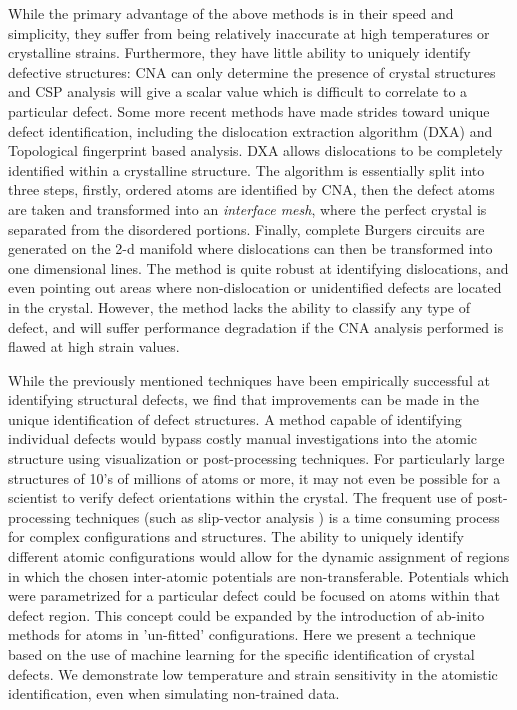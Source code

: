 \documentclass[12pt]{iopart}
\begin{document}
While the primary advantage of the above methods is in their speed and simplicity, they suffer from being relatively inaccurate at high temperatures or crystalline strains. Furthermore, they have little ability to uniquely identify defective structures: CNA can only determine the presence of crystal structures and CSP analysis will give a scalar value which is difficult to correlate to a particular defect. Some more recent methods have made strides toward unique defect identification, including the dislocation extraction algorithm (DXA)\cite{Stukowski2010b} and Topological fingerprint based analysis\cite{Schablitzki2013}. DXA allows dislocations to be completely identified within a crystalline structure. The algorithm is essentially split into three steps, firstly, ordered atoms are identified by CNA, then the defect atoms are taken and transformed into an \emph{interface mesh}, where the perfect crystal is separated from the disordered portions. Finally, complete Burgers circuits are generated on the 2-d manifold where dislocations can then be transformed into one dimensional lines. The method is quite robust at identifying dislocations, and even pointing out areas where non-dislocation or unidentified defects are located in the crystal. However, the method lacks the ability to classify any type of defect, and will suffer performance degradation if the CNA analysis performed is flawed at high strain values. 

While the previously mentioned techniques have been empirically successful at identifying structural defects, we find that improvements can be made in the unique identification of defect structures. A method capable of identifying individual defects would bypass costly manual investigations into the atomic structure using visualization or post-processing techniques. For particularly large structures of 10's of millions of atoms or more, it may not even be possible for a scientist to verify defect orientations within the crystal. The frequent use of post-processing techniques (such as slip-vector analysis \cite{Zimmerman2001}) is a time consuming process for complex configurations and structures. The ability to uniquely identify different atomic configurations would allow for the dynamic assignment of regions in which the chosen inter-atomic potentials are non-transferable. Potentials which were parametrized for a particular defect could be focused on atoms within that defect region. This concept could be expanded by the introduction of ab-inito methods for atoms in 'un-fitted' configurations. Here we present a technique based on the use of machine learning for the specific identification of crystal defects. We demonstrate low temperature and strain sensitivity in the atomistic identification, even when simulating non-trained data. 
\end{document}
